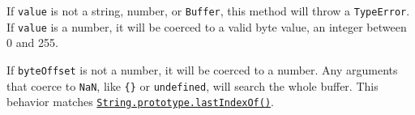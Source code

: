 \begin{Shaded}
\begin{Highlighting}[]
\NormalTok{(}\StringTok{\textquotesingle{}}\StringTok{\textquotesingle{}}\OperatorTok{,} \OperatorTok{,} \NormalTok{))}\OperatorTok{;}
\NormalTok{(}\StringTok{\textquotesingle{}}\StringTok{\textquotesingle{}}\OperatorTok{,} \OperatorTok{{-}}\OperatorTok{,} \NormalTok{))}\OperatorTok{;}
\end{Highlighting}
\end{Shaded}

If \texttt{value} is not a string, number, or \texttt{Buffer}, this
method will throw a \texttt{TypeError}. If \texttt{value} is a number,
it will be coerced to a valid byte value, an integer between 0 and 255.

If \texttt{byteOffset} is not a number, it will be coerced to a number.
Any arguments that coerce to \texttt{NaN}, like \texttt{\{\}} or
\texttt{undefined}, will search the whole buffer. This behavior matches
\href{https://developer.mozilla.org/en-US/docs/Web/JavaScript/Reference/Global_Objects/String/lastIndexOf}{\texttt{String.prototype.lastIndexOf()}}.

